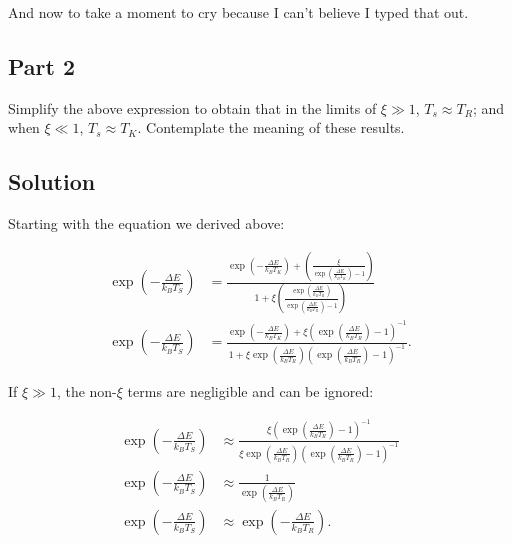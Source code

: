\documentclass[12pt]{article}
\begin{document}
And now to take a moment to cry because I can't believe I typed that out.


\subsection*{Part 2}

Simplify the above expression to obtain that in the limits of $\xi \gg 1$, $T_s \approx T_R$; and when $\xi \ll 1$, $T_s \approx T_K$. Contemplate the meaning of these results.


\subsection*{Solution}

Starting with the equation we derived above:

\begin{equation*}
\begin{split}
\exp\left(-\frac{\Delta E}{k_BT_S}\right) &= \frac{\exp\left(-\frac{\Delta E}{k_BT_K}\right) + \left(\frac{\xi}{\exp\left(\frac{\Delta E}{k_BT_R}\right)-1}\right) }{1 + \xi\left(\frac{\exp\left(\frac{\Delta E}{k_BT_R}\right)}{\exp\left(\frac{\Delta E}{k_BT_R}\right)-1}\right)}\\
\exp\left(-\frac{\Delta E}{k_BT_S}\right) &= \frac{\exp\left(-\frac{\Delta E}{k_BT_K}\right) + \xi\left(\exp\left(\frac{\Delta E}{k_BT_R}\right)-1\right)^{-1} }{1 + \xi\exp\left(\frac{\Delta E}{k_BT_R}\right)\left(\exp\left(\frac{\Delta E}{k_BT_R}\right)-1\right)^{-1}}.
\end{split}
\end{equation*}

If $\xi\gg1$, the non-$\xi$ terms are negligible and can be ignored:

\begin{equation*}
\begin{split}
\exp\left(-\frac{\Delta E}{k_BT_S}\right) &\approx \frac{\xi\left(\exp\left(\frac{\Delta E}{k_BT_R}\right)-1\right)^{-1} }{\xi\exp\left(\frac{\Delta E}{k_BT_R}\right)\left(\exp\left(\frac{\Delta E}{k_BT_R}\right)-1\right)^{-1}}\\
\exp\left(-\frac{\Delta E}{k_BT_S}\right) &\approx \frac{1}{\exp\left(\frac{\Delta E}{k_BT_R}\right)}\\
\exp\left(-\frac{\Delta E}{k_BT_S}\right) &\approx \exp\left(-\frac{\Delta E}{k_BT_R}\right).
\end{split}
\end{equation*}
\end{document}
